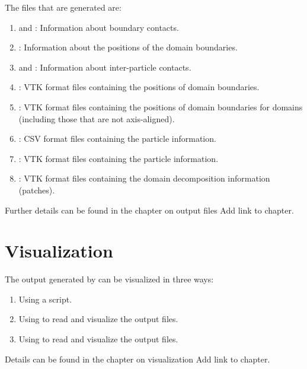 \documentclass[11pt,fleqn]{book} %
\begin{document}
The files that are generated are:
\begin{enumerate}
  \item {} and  : Information about
        boundary contacts.
  \item {} : Information about the positions of the domain boundaries.
  \item {} and  : Information about
        inter-particle contacts.
  \item {} : VTK format files containing the positions of domain boundaries.
  \item {} : VTK format files containing the positions of domain 
        boundaries for domains (including those that are not axis-aligned).
  \item {} : CSV format files containing the particle information.
  \item {} : VTK format files containing the particle information.
  \item {} : VTK format files containing the domain decomposition
        information (patches).
\end{enumerate}

Further details can be found in the chapter on output files {\Red Add link to chapter}.

\section{Visualization}
The output generated by \GranularSim can be visualized in three ways:

\begin{enumerate}
  \item Using a  script.
  \item Using \ParaView to read and visualize the  output files.
  \item Using \Visit to read and visualize the  output files.
\end{enumerate}

Details can be found in the chapter on visualization {\Red Add link to chapter}.


%
\end{document}
